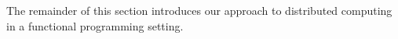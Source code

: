 \documentclass[a4paper,12pt]{article}
\begin{document}

\medskip

The remainder of this section introduces our approach to distributed
computing in a functional programming setting.
\end{document}
